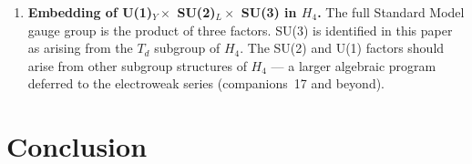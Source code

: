 \documentclass[12pt]{article}
\begin{document}
\begin{enumerate}
\item \textbf{Embedding of U(1)$_Y \times$ SU(2)$_L \times$ SU(3)
  in $H_4$.}
  The full Standard Model gauge group is the product of three
  factors.  SU(3) is identified in this paper as arising from the
  $T_d$ subgroup of $H_4$.  The SU(2) and U(1) factors should arise
  from other subgroup structures of $H_4$ --- a larger algebraic
  program deferred to the electroweak series (companions~17 and
  beyond).
\end{enumerate}

\section{Conclusion}
\label{sec:conclusion}
\end{document}
